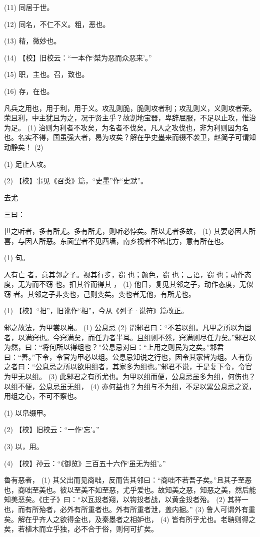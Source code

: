 \documentclass[12pt,UTF8]{ctexbook}
\begin{document}
(11) 同居于世。

(12) 同名，不仁不义。粗，恶也。

(13) 精，微妙也。

(14) 【校】旧校云：“一本作‘桀为恶而众恶来’。”

(15) 职，主也。召，致也。

(16) 存，在也。

凡兵之用也，用于利，用于义。攻乱则脆，脆则攻者利；攻乱则义，义则攻者荣。荣且利，中主犹且为之，况于贤主乎？故割地宝器，卑辞屈服，不足以止攻，惟治为足。 (1) 治则为利者不攻矣，为名者不伐矣。凡人之攻伐也，非为利则因为名也。名实不得，国虽强大者，曷为攻矣？解在乎史墨来而辍不袭卫，赵简子可谓知动静矣！ (2)

(1) 足止人攻。

(2) 【校】事见《召类》篇，“史墨”作“史默”。





去尤


三曰：

世之听者，多有所尤。多有所尤，则听必悖矣。所以尤者多故， (1) 其要必因人所喜，与因人所恶。东面望者不见西墙，南乡视者不睹北方，意有所在也。

(1) 句。

人有亡 者，意其邻之子。视其行步，窃 也；颜色，窃 也；言语，窃 也；动作态度，无为而不窃 也。抇其谷而得其 ， (1) 他日，复见其邻之子，动作态度，无似窃 者。其邻之子非变也，己则变矣。变也者无他，有所尤也。

(1) 【校】“抇”，旧讹作“相”，今从《列子·说符》篇改正。

邾之故法，为甲裳以帛。 (1) 公息忌 (2) 谓邾君曰：“不若以组。凡甲之所以为固者，以满窍也。今窍满矣，而任力者半耳。且组则不然，窍满则尽任力矣。”邾君以为然，曰：“将何所以得组也？”公息忌对曰：“上用之则民为之矣。”邾君曰：“善。”下令，令官为甲必以组。公息忌知说之行也，因令其家皆为组。人有伤之者曰：“公息忌之所以欲用组者，其家多为组也。”邾君不说，于是复下令，令官为甲无以组。 (3) 此邾君之有所尤也。为甲以组而便，公息忌虽多为组，何伤也？以组不便，公息忌虽无组， (4) 亦何益也？为组与不为组，不足以累公息忌之说，用组之心，不可不察也。

(1) 以帛缀甲。

(2) 【校】旧校云：“一作‘忘’。”

(3) 以，用。

(4) 【校】孙云：“《御览》三百五十六作‘虽无为组’。”

鲁有恶者， (1) 其父出而见商咄，反而告其邻曰：“商咄不若吾子矣。”且其子至恶也，商咄至美也。彼以至美不如至恶，尤乎爱也。故知美之恶，知恶之美，然后能知美恶矣。《庄子》曰：“以瓦殶者翔，以钩殶者战，以黄金殶者殆。 (2) 其祥一也，而有所殆者，必外有所重者也。外有所重者泄，盖内掘。” (3) 鲁人可谓外有重矣。解在乎齐人之欲得金也，及秦墨者之相妒也， (4) 皆有所乎尤也。老聃则得之矣，若植木而立乎独，必不合于俗，则何可扩矣。
\end{document}
